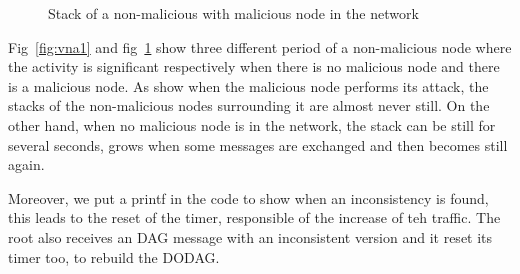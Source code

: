 \documentclass{report}
\begin{document}
\begin{figure}
    \caption{Stack of a non-malicious with malicious node in the network}
\label{fig:vna2}
\end{figure}

Fig~\ref{fig:vna1} and fig~\ref{fig:vna2} show
three different period of a non-malicious node
where the activity is significant respectively when there is no
malicious node and there is a malicious node.
As show when the malicious node performs its attack, the stacks of the
non-malicious nodes surrounding it are almost never still. On the other
hand, when no malicious node is in the network, the stack can be still
for several seconds, grows when some messages are exchanged and then
becomes still again.

Moreover, we put a printf in the code to show when an inconsistency is
found, this leads to the reset of the timer, responsible of the increase
of teh traffic. The root also receives an DAG message with an
inconsistent version and it reset its timer too, to rebuild the \textsc{DODAG}.\\
\end{document}
